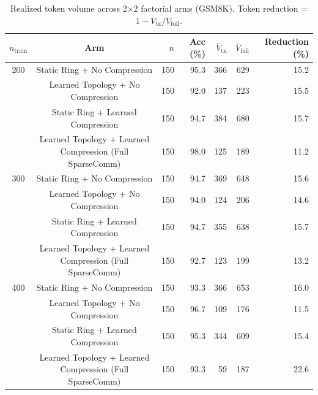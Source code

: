 \begin{table}[t]
\centering
\caption{Realized token volume across 2$\times$2 factorial arms (GSM8K). Token reduction = $1 - V_{\text{tx}}/V_{\text{full}}$.}
\label{tab:factorial_volume}
\small
\begin{tabular}{ccrrrrr}
\toprule
$n_{\text{train}}$ & Arm & $n$ & Acc (\%) & $\bar{V}_{\text{tx}}$ & $\bar{V}_{\text{full}}$ & Reduction (\%) \\
\midrule
  200 & Static Ring + No Compression & 150 & 95.3 & 366 & 629 & 15.2 \\
   & Learned Topology + No Compression & 150 & 92.0 & 137 & 223 & 15.5 \\
   & Static Ring + Learned Compression & 150 & 94.7 & 384 & 680 & 15.7 \\
   & Learned Topology + Learned Compression (Full SparseComm) & 150 & 98.0 & 125 & 189 & 11.2 \\
\midrule
  300 & Static Ring + No Compression & 150 & 94.7 & 369 & 648 & 15.6 \\
   & Learned Topology + No Compression & 150 & 94.0 & 124 & 206 & 14.6 \\
   & Static Ring + Learned Compression & 150 & 94.7 & 355 & 638 & 15.7 \\
   & Learned Topology + Learned Compression (Full SparseComm) & 150 & 92.7 & 123 & 199 & 13.2 \\
\midrule
  400 & Static Ring + No Compression & 150 & 93.3 & 366 & 653 & 16.0 \\
   & Learned Topology + No Compression & 150 & 96.7 & 109 & 176 & 11.5 \\
   & Static Ring + Learned Compression & 150 & 95.3 & 344 & 609 & 15.4 \\
   & Learned Topology + Learned Compression (Full SparseComm) & 150 & 93.3 & 59 & 187 & 22.6 \\
\bottomrule
\end{tabular}
\end{table}